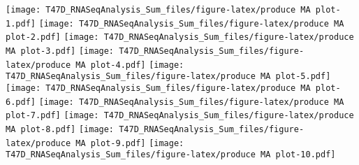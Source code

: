 \documentclass[]{article}
\begin{document}
\texttt{[image: T47D\_RNASeqAnalysis\_Sum\_files/figure-latex/produce MA plot-1.pdf]}
\texttt{[image: T47D\_RNASeqAnalysis\_Sum\_files/figure-latex/produce MA plot-2.pdf]}
\texttt{[image: T47D\_RNASeqAnalysis\_Sum\_files/figure-latex/produce MA plot-3.pdf]}
\texttt{[image: T47D\_RNASeqAnalysis\_Sum\_files/figure-latex/produce MA plot-4.pdf]}
\texttt{[image: T47D\_RNASeqAnalysis\_Sum\_files/figure-latex/produce MA plot-5.pdf]}
\texttt{[image: T47D\_RNASeqAnalysis\_Sum\_files/figure-latex/produce MA plot-6.pdf]}
\texttt{[image: T47D\_RNASeqAnalysis\_Sum\_files/figure-latex/produce MA plot-7.pdf]}
\texttt{[image: T47D\_RNASeqAnalysis\_Sum\_files/figure-latex/produce MA plot-8.pdf]}
\texttt{[image: T47D\_RNASeqAnalysis\_Sum\_files/figure-latex/produce MA plot-9.pdf]}
\texttt{[image: T47D\_RNASeqAnalysis\_Sum\_files/figure-latex/produce MA plot-10.pdf]}
\end{document}

